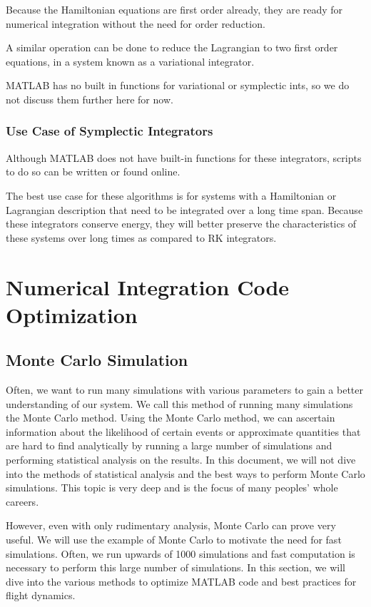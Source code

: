 \documentclass[12pt]{report}
\begin{document}
Because the Hamiltonian equations are first order already, they are ready for numerical integration without the need for order reduction.

A similar operation can be done to reduce the \gls{Lagrangian} to two first order equations, in a system known as a variational integrator.

MATLAB has no built in functions for variational or \glspl{symplectic int}, so we do not discuss them further here for now.

\subsubsection{Use Case of Symplectic Integrators}
Although MATLAB does not have built-in functions for these integrators, scripts to do so can be written or found online.

The best use case for these algorithms is for systems with a Hamiltonian or Lagrangian description that need to be integrated over a long time span. Because these integrators conserve energy, they will better preserve the characteristics of these systems over long times as compared to RK integrators.

\section{Numerical Integration Code Optimization}\label{sec: code optimization}
\subsection{Monte Carlo Simulation}
Often, we want to run many simulations with various parameters to gain a better understanding of our system. We call this method of running many simulations the Monte Carlo method. Using the Monte Carlo method, we can ascertain information about the likelihood of certain events or approximate quantities that are hard to find analytically by running a large number of simulations and performing statistical analysis on the results. In this document, we will not dive into the methods of statistical analysis and the best ways to perform Monte Carlo simulations. This topic is very deep and is the focus of many peoples’ whole careers.

However, even with only rudimentary analysis, Monte Carlo can prove very useful. We will use the example of Monte Carlo to motivate the need for fast simulations. Often, we run upwards of 1000 simulations and fast computation is necessary to perform this large number of simulations. In this section, we will dive into the various methods to optimize MATLAB code and best practices for flight dynamics.
\end{document}

